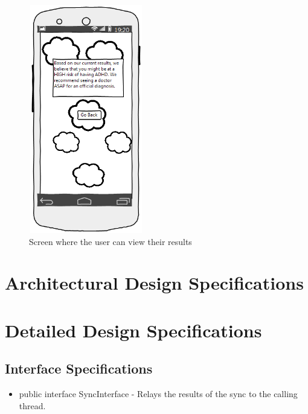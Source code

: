 \documentclass[a4wide]{article}
\begin{document}
\begin{figure}[H]
\centering
\includegraphics[height=10cm, width = 5cm]{images/diagnosis_screen.png}
\caption{Screen where the user can view their results}
\label{fig:diagnosis_screen}
\end{figure}


\section{Architectural Design Specifications}
\section{Detailed Design Specifications}

\subsection{Interface Specifications}
\begin{itemize}
\item public interface SyncInterface\newline
- Relays the results of the sync to the calling thread.
\end{itemize}
\end{document}
